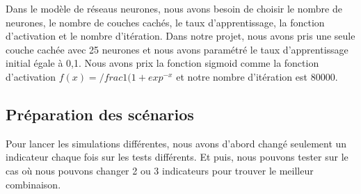 Dans le modèle de réseaus neurones, nous avons besoin de choisir le nombre de neurones, le nombre de couches cachés, le taux d'apprentissage, la fonction d’activation et le nombre d'itération. Dans notre projet, nous avons pris une seule couche cachée avec 25 neurones et nous avons paramétré le taux d'apprentissage initial égale à 0,1. Nous avons prix la fonction sigmoid comme la fonction d'activation $ f(x) = /frac{1}{(1 + exp^{-x}} $ et notre nombre d'itération est 80000.

\subsection{Préparation des scénarios}

Pour lancer les simulations différentes, nous avons d'abord changé seulement un indicateur chaque fois sur les tests différents. Et puis, nous pouvons tester sur le cas où nous pouvons changer 2 ou 3 indicateurs pour trouver le meilleur combinaison.\\ 





